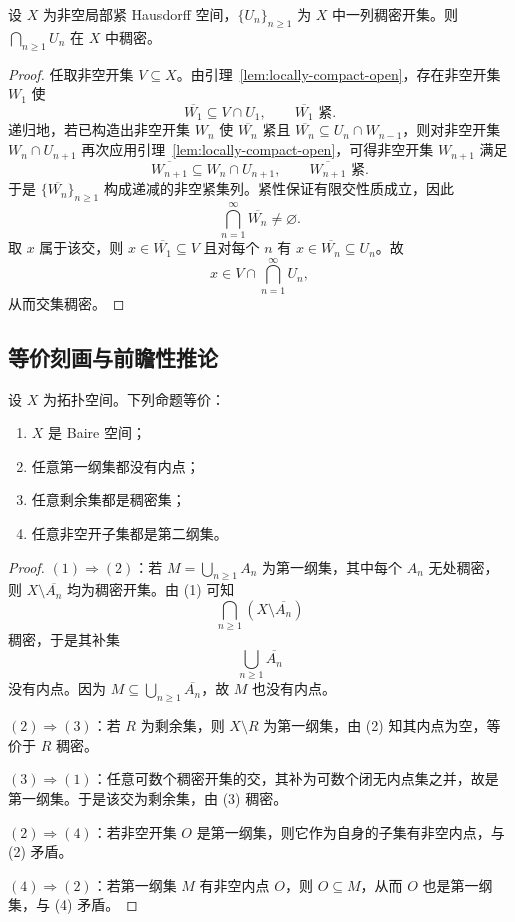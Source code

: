 \begin{theorem}\label{thm:baire-locally-compact}
设 $X$ 为非空局部紧 Hausdorff 空间，$\{U_n\}_{n\ge1}$ 为 $X$ 中一列稠密开集。则 $\bigcap_{n\ge1}U_n$ 在 $X$ 中稠密。
\end{theorem}

\begin{proof}
任取非空开集 $V\subseteq X$。由引理~\ref{lem:locally-compact-open}，存在非空开集 $W_1$ 使
\[
\overline{W_1}\subseteq V\cap U_1,\qquad \overline{W_1}\text{ 紧}.
\]
递归地，若已构造出非空开集 $W_n$ 使 $\overline{W_n}$ 紧且 $\overline{W_n}\subseteq U_n\cap W_{n-1}$，则对非空开集 $W_n\cap U_{n+1}$ 再次应用引理~\ref{lem:locally-compact-open}，可得非空开集 $W_{n+1}$ 满足
\[
\overline{W_{n+1}}\subseteq W_n\cap U_{n+1},\qquad \overline{W_{n+1}}\text{ 紧}.
\]
于是 $\{\overline{W_n}\}_{n\ge1}$ 构成递减的非空紧集列。紧性保证有限交性质成立，因此
\[
\bigcap_{n=1}^{\infty}\overline{W_n}\neq\varnothing.
\]
取 $x$ 属于该交，则 $x\in \overline{W_1}\subseteq V$ 且对每个 $n$ 有 $x\in \overline{W_n}\subseteq U_n$。故
\[
x\in V\cap\bigcap_{n=1}^{\infty}U_n,
\]
从而交集稠密。
\end{proof}

\subsection{等价刻画与前瞻性推论}

\begin{proposition}\label{prop:baire-equivalent}
设 $X$ 为拓扑空间。下列命题等价：
\begin{enumerate}
  \item $X$ 是 Baire 空间；
  \item 任意第一纲集都没有内点；
  \item 任意剩余集都是稠密集；
  \item 任意非空开子集都是第二纲集。
\end{enumerate}
\end{proposition}

\begin{proof}
$(1)\Rightarrow(2)$：若 $M=\bigcup_{n\ge1}A_n$ 为第一纲集，其中每个 $A_n$ 无处稠密，则 $X\setminus \overline{A_n}$ 均为稠密开集。由 (1) 可知
\[
\bigcap_{n\ge1}(X\setminus\overline{A_n})
\]
稠密，于是其补集
\[
\bigcup_{n\ge1}\overline{A_n}
\]
没有内点。因为 $M\subseteq \bigcup_{n\ge1}\overline{A_n}$，故 $M$ 也没有内点。

$(2)\Rightarrow(3)$：若 $R$ 为剩余集，则 $X\setminus R$ 为第一纲集，由 (2) 知其内点为空，等价于 $R$ 稠密。

$(3)\Rightarrow(1)$：任意可数个稠密开集的交，其补为可数个闭无内点集之并，故是第一纲集。于是该交为剩余集，由 (3) 稠密。

$(2)\Rightarrow(4)$：若非空开集 $O$ 是第一纲集，则它作为自身的子集有非空内点，与 (2) 矛盾。

$(4)\Rightarrow(2)$：若第一纲集 $M$ 有非空内点 $O$，则 $O\subseteq M$，从而 $O$ 也是第一纲集，与 (4) 矛盾。
\end{proof}

